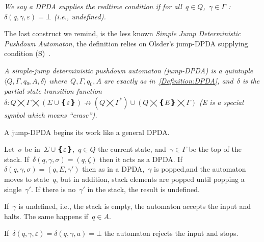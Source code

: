 \begin{Definition}
  \label{Definition:realtime}
  \slshape
We say a DPDA supplies the \emph{realtime condition} if 
  for all~$q∈Q$,~$γ∈Γ$ :~$δ(q,γ,ε)=⊥$ (i.e., undefined).
\end{Definition}
% 

The last construct we remind, is the less known \emph{Simple Jump Deterministic Pushdown Automaton},
the definition relies on Olsder's jump-DPDA supplying condition (S)~\cite{Olsder:05}.

\begin{Definition}
  \label{Definition:JDPDA}
  \slshape
  A \emph{simple-jump deterministic pushdown automaton} (jump-DPDA) is a quintuple~$⟨Q,Γ,q₀,A,δ⟩$
  where~$Q,\Gamma,q_0,A$ are exactly as in~\cref{Definition:DPDA},
  and~$δ$ is the 
  \emph{partial state transition function}~$δ:Q⨉Γ⨉(Σ∪❴ε❵)↛(Q⨉Γ^*)∪(Q⨉❴E❵⨉Γ)$
  (E is a special symbol which means ``erase'').
  \par
  A jump-DPDA begins its work like a general DPDA\@. 
  \par
  Let~$σ$ be in~$Σ∪❴ε❵$,~$q∈Q$ the current state, and~$γ∈Γ$ be the top of the stack. 
  If~$δ(q,γ,σ)=(q,ζ)$ then it acts as a DPDA.
  If~$δ(q,γ,σ)=(q,E,γ')$ then as in a DPDA,~$γ$ is popped,and the automaton
  moves to state~$q$, but in addition, stack elements are popped until
  popping a single~$γ'$. 
  If there is no~$γ'$ in the stack, the result is undefined.
  \par
  If~$γ$ is undefined, i.e., the stack is empty, the automaton accepts the input and halts.
  The same happens if~$q∈A$.
  \par
  If~$δ(q,γ,ε)=δ(q,γ,a)=⊥$ the automaton rejects the input and stops.
\end{Definition}

